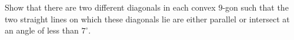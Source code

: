 Show that there are two different diagonals in each convex $9$-gon such that the two straight lines
on which these diagonals lie are either parallel or intersect at an angle of less than $7^\circ$.